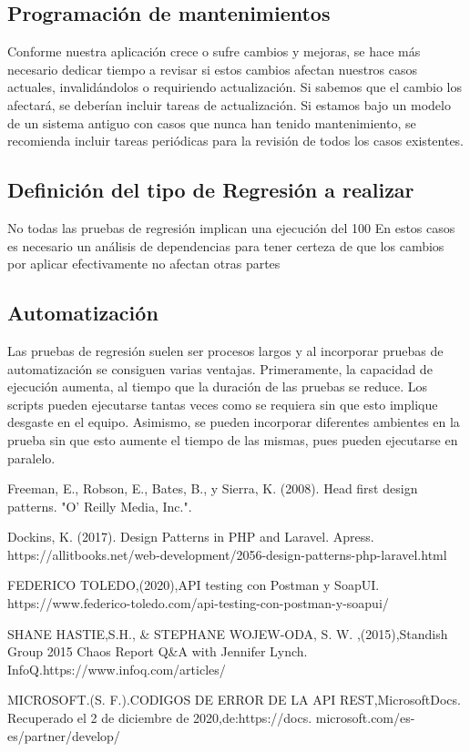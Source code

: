 \documentclass{article}
\begin{document}
\begin{multicols}{2}
\subsection{Programación de mantenimientos}
Conforme nuestra aplicación crece o sufre cambios
y mejoras, se hace más necesario dedicar
tiempo a revisar si estos cambios afectan nuestros
casos actuales, invalidándolos o requiriendo actualización. Si sabemos que el cambio los afectará, se
deberían incluir tareas de actualización.
Si estamos bajo un modelo de un sistema antiguo
con casos que nunca han tenido mantenimiento, se
recomienda incluir tareas periódicas para la revisión
de todos los casos existentes.
\subsection{Definición del tipo de Regresión a realizar}
No todas las pruebas de regresión implican una
ejecución del 100
En estos casos es necesario un análisis de dependencias
para tener certeza de que los cambios
por aplicar efectivamente no afectan otras partes
\subsection{Automatización}
Las pruebas de regresión suelen ser procesos largos
y al incorporar pruebas de automatización se
consiguen varias ventajas.
Primeramente, la capacidad de ejecución aumenta,
al tiempo que la duración de las pruebas se
reduce.
Los scripts pueden ejecutarse tantas veces como
se requiera sin que esto implique desgaste en el
equipo.
Asimismo, se pueden incorporar diferentes ambientes
en la prueba sin que esto aumente el tiempo
de las mismas, pues pueden ejecutarse en paralelo.
\end{multicols}

\begin{thebibliography}{XXX0000}
     Freeman, E., Robson, E., Bates, B., y Sierra, K. (2008). Head first design patterns. "O' Reilly Media, Inc.".

     Dockins, K. (2017). Design Patterns in PHP and Laravel. Apress. \\https://allitbooks.net/web-development/2056-design-patterns-php-laravel.html
    
    FEDERICO TOLEDO,(2020),API testing con Postman y SoapUI.
    https://www.federico-toledo.com/api-testing-con-postman-y-soapui/
   
    SHANE HASTIE,S.H., & STEPHANE WOJEW-ODA, S. W. ,(2015),Standish 
    Group 2015 Chaos Report   Q&A with Jennifer Lynch. 
    InfoQ.https://www.infoq.com/articles/
  
    MICROSOFT.(S.  F.).CODIGOS DE ERROR DE LA API REST,MicrosoftDocs.  
    Recuperado el 2 de diciembre de 2020,de:https://docs. microsoft.com/es-es/partner/develop/
    \end{thebibliography}
\end{document}
